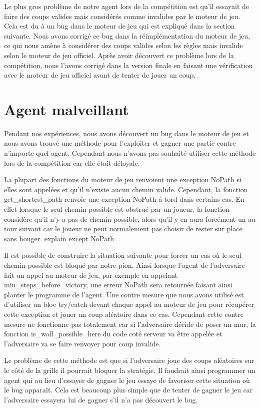 \documentclass[12pt]{article}
\begin{document}
Le plus gros problème de notre agent lors de la compétition est qu'il essayait de faire des coups valides mais considérés comme invalides par le moteur de jeu. Cela est du à un bug dans le moteur de jeu qui est expliqué dans la section suivante. Nous avons corrigé ce bug dans la réimplémentation du moteur de jeu, ce qui nous amène à considérer des coups valides selon les règles mais invalide selon le moteur de jeu officiel. Après avoir découvert ce problème lors de la compétition, nous l'avons corrigé dans la version finale en faisant une vérification avec le moteur de jeu officiel avant de tenter de jouer un coup. 

\section*{Agent malveillant}

Pendant nos expériences, nous avons découvert un bug dans le moteur de jeu et nous avons trouvé une méthode pour l'exploiter et gagner une partie contre n'importe quel agent. Cependant nous n'avons pas souhaité utiliser cette méthode lors de la compétition car elle était déloyale. 

La plupart des fonctions du moteur de jeu renvoient une exception NoPath si elles sont appelées et qu'il n'existe aucun chemin valide. Cependant, la fonction get\_shortest\_path renvoie une exception NoPath à tord dans certains cas. En effet lorsque le seul chemin possible est obstrué par un joueur, la fonction considère qu'il n'y a pas de chemin possible, alors qu'il y en aura forcément un au tour suivant car le joueur ne peut normalement pas choisir de rester sur place sans bouger.
explain except NoPath


Il est possible de construire la situation suivante pour forcer un cas où le seul chemin possible est bloqué par notre pion. Ainsi lorsque l'agent de l'adversaire fait un appel au moteur de jeu, par exemple en appelant min\_steps\_before\_victory, une erreur NoPath sera retournée faisant ainsi planter le programme de l'agent. Une contre mesure que nous avons utilisé est d'utiliser un bloc try/catch devant chaque appel au moteur de jeu pour récupérer cette exception et jouer un coup aléatoire dans ce cas. Cependant cette contre mesure ne fonctionne pas totalement car si l'adversaire décide de poser un mur, la fonction is\_wall\_possible\_here du code coté serveur va être appelée et l'adversaire va se faire renvoyer pour coup invalide. 

Le problème de cette méthode est que si l'adversaire joue des coups aléatoires sur le côté de la grille il pourrait bloquer la stratégie. Il faudrait ainsi programmer un agent qui au lieu d'essayer de gagner le jeu essaye de favoriser cette situation où le bug apparaît. Cela est beaucoup plus simple que de tenter de gagner le jeu car l'adversaire essayera lui de gagner s'il n'a pas découvert le bug. 
\end{document}
